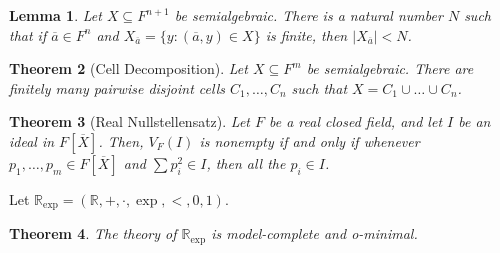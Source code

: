 \documentclass{amsart}
\newtheorem{theorem}{Theorem}[subsection]
\newtheorem{lemma}[theorem]{Lemma}
\newtheorem{corollary}[theorem]{Corollary}
\theoremstyle{definition}
\numberwithin{equation}{section}
\begin{document}
\begin{lemma}
  Let $X \subseteq F^{n+1}$ be semialgebraic.
  There is a natural number $N$ such that if $\overline{a}\in F^n$
  and $X_{\overline{a}} = \{y: (\overline{a},y)\in X\}$ is finite,
  then $|X_{\overline{a}}| < N$.
\end{lemma}

\begin{theorem}[Cell Decomposition]
  Let $X \subseteq F^m$ be semialgebraic.
  There are finitely many pairwise disjoint cells $C_1,\dots,C_n$ such that $X = C_1 \cup \dots \cup C_n$.
\end{theorem}

\begin{theorem}[Real Nullstellensatz]
  Let $F$ be a real closed field,
  and let $I$ be an ideal in $F[\overline{X}]$.
  Then, $V_F(I)$ is nonempty if and only if whenever $p_1,\dots,p_m\in F[\overline{X}]$ and $\sum p_i^2 \in I$,
  then all the $p_i \in I$. 
\end{theorem}

Let $\mathbb{R}_{\exp} = (\mathbb{R},+,\cdot,\exp,<,0,1)$.

\begin{theorem}
  The theory of $\mathbb{R}_{\exp}$ is model-complete and o-minimal.
\end{theorem}




\end{document}
